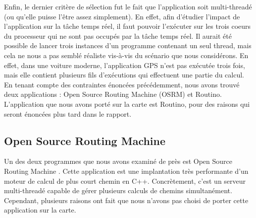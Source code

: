 Enfin, le dernier critère de sélection fut le fait que l'application soit 
multi-threadé (ou qu'elle puisse l'être assez simplement). En effet, afin 
d'étudier l'impact de l'application sur la tâche temps réel, il faut pouvoir 
l'exécuter sur les trois coeurs du processeur qui ne sont pas occupés par la
tâche temps réel. Il aurait été possible de lancer trois instances d'un 
programme contenant un seul thread, mais cela ne nous a pas semblé réaliste 
vis-à-vis du scénario que nous considérons. En effet, dans une voiture moderne, 
l'application GPS n'est pas exécutée trois fois, mais elle contient plusieurs 
fils d'exécutions qui effectuent une partie du calcul. \\

En tenant compte des contraintes énoncées précédemment, nous avons trouvé deux
applications : Open Source Routing Machine (OSRM) et Routino. L'application que
nous avons porté sur la carte est Routino, pour des raisons qui seront énoncées
plus tard dans le rapport.

\subsection{Open Source Routing Machine}

Un des deux programmes que nous avons examiné de près est Open Source Routing 
Machine \cite{_open_????}. Cette application est une implantation 
très performante d'un moteur de calcul de plus court chemin en C++. 
Concrètement, c'est un serveur multi-threadé capable de gérer plusieurs calculs 
de chemins simultanément. Cependant, plusieurs raisons ont fait que nous 
n'avons pas choisi de porter cette application sur la carte. \\


